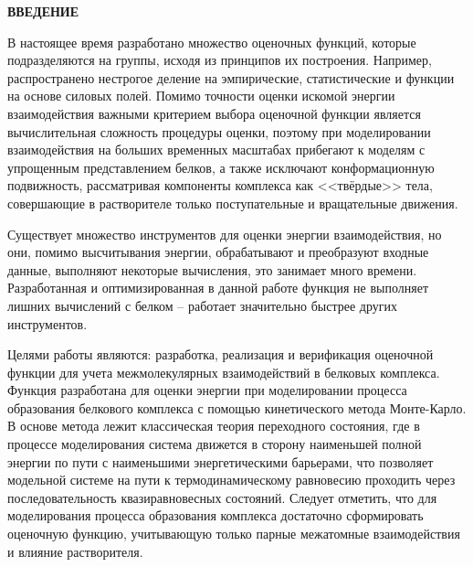 \newpage
\begin{center}
  \textbf{\large ВВЕДЕНИЕ}
\end{center}

В настоящее время разработано множество оценочных функций, которые подразделяются на группы, исходя из принципов их построения. Например, распространено нестрогое деление на эмпирические, статистические и функции на основе силовых полей\cite{ci500731a}. Помимо точности оценки искомой энергии взаимодействия важными критерием выбора оценочной функции является вычислительная сложность процедуры оценки, поэтому при моделировании взаимодействия на больших временных масштабах прибегают к моделям с упрощенным представлением белков\cite{biom10071056}, а также исключают конформационную подвижность, рассматривая компоненты комплекса как <<твёрдые>> тела, совершающие в растворителе только поступательные и вращательные движения.

Существует множество инструментов для оценки энергии взаимодействия, но они, помимо высчитывания энергии, обрабатывают и преобразуют входные данные, выполняют некоторые вычисления, это занимает много времени. Разработанная и оптимизированная в данной работе функция не выполняет лишних вычислений с белком -- работает значительно быстрее других инструментов.

Целями работы являются: разработка, реализация и верификация оценочной функции для учета межмолекулярных взаимодействий в белковых комплекса.
Функция разработана для оценки энергии при моделировании процесса образования белкового комплекса с помощью кинетического метода Монте-Карло\cite{Voter}. В основе метода лежит классическая теория переходного состояния, где в процессе моделирования система движется в сторону наименьшей полной энергии по пути с наименьшими энергетическими барьерами, что позволяет модельной системе на пути к термодинамическому равновесию проходить через последовательность квазиравновесных состояний. Следует отметить, что для моделирования процесса образования комплекса достаточно сформировать оценочную функцию, учитывающую только парные межатомные взаимодействия и влияние растворителя\cite{biom10071056}. 
